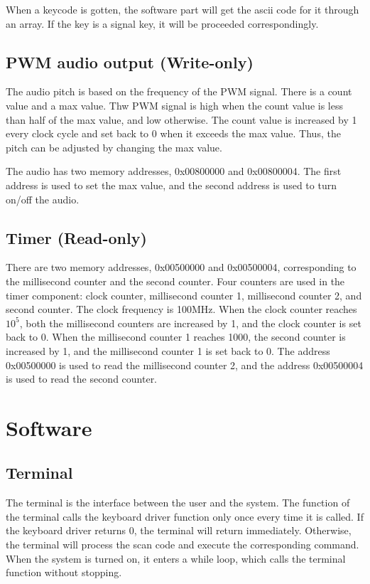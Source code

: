 \documentclass[
	a4paper, %
	11pt, %
]{CSUniSchoolLabReport}
\begin{document}
When a keycode is gotten, the software part will get the ascii code for it through an array. If the key is a signal key, it will be proceeded correspondingly.


\subsection{PWM audio output (Write-only)}
The audio pitch is based on the frequency of the PWM signal. There is a count value and a max value. Thw PWM signal is high when the count value is less than half of the max value, and low otherwise. The count value is increased by 1 every clock cycle and set back to 0 when it exceeds the max value. Thus, the pitch can be adjusted by changing the max value.

The audio has two memory addresses, 0x00800000 and 0x00800004. The first address is used to set the max value, and the second address is used to turn on/off the audio.

\subsection{Timer (Read-only)}
There are two memory addresses, 0x00500000 and 0x00500004, corresponding to the millisecond counter and the second counter. Four counters are used in the timer component: clock counter, millisecond counter 1, millisecond counter 2, and second counter. The clock frequency is 100MHz. When the clock counter reaches $10^5$, both the millisecond counters are increased by 1, and the clock counter is set back to 0. When the millisecond counter 1 reaches 1000, the second counter is increased by 1, and the millisecond counter 1 is set back to 0. The address 0x00500000 is used to read the millisecond counter 2, and the address 0x00500004 is used to read the second counter.

\section{Software}
\subsection{Terminal}
The terminal is the interface between the user and the system. The function of the terminal calls the keyboard driver function only once every time it is called. If the keyboard driver returns 0, the terminal will return immediately. Otherwise, the terminal will process the scan code and execute the corresponding command. When the system is turned on, it enters a while loop, which calls the terminal function without stopping.
\end{document}
